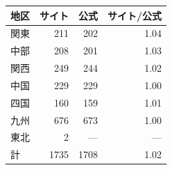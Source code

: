 \begin{tabular}{lrrr}
\toprule
地区 & サイト & 公式 & サイト/公式 \\
\midrule
関東 & 211 & 202 & 1.04 \\
中部 & 208 & 201 & 1.03 \\
関西 & 249 & 244 & 1.02 \\
中国 & 229 & 229 & 1.00 \\
四国 & 160 & 159 & 1.01 \\
九州 & 676 & 673 & 1.00 \\
東北 & 2 & --- & --- \\
\midrule
計 & 1735 & 1708 & 1.02 \\
\bottomrule
\end{tabular}
